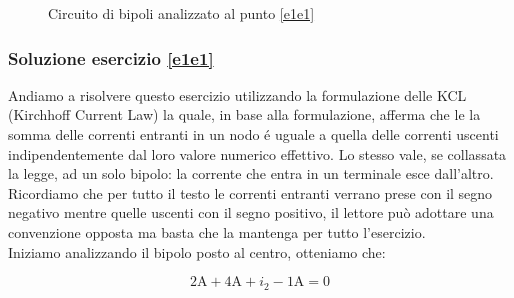 \documentclass[../main.tex]{subfiles}
\begin{document}
\begin{figure}[h!]
\begin{center}

	
\end{center}
\caption{Circuito di bipoli analizzato al punto \ref{e1e1}}
\end{figure}
\label{fe1e1}


\subsubsection*{Soluzione esercizio \ref{e1e1}}

Andiamo a risolvere questo esercizio utilizzando la formulazione delle KCL (Kirchhoff Current Law) la quale, in base alla formulazione, afferma che le la somma delle correnti entranti in un nodo é uguale a quella delle correnti uscenti indipendentemente dal loro valore numerico effettivo. Lo stesso vale, se collassata la legge, ad un solo bipolo: la corrente che entra in un terminale esce dall'altro.\\

Ricordiamo che per tutto il testo le correnti entranti verrano prese con il segno negativo mentre quelle uscenti con il segno positivo, il lettore può adottare una convenzione opposta ma basta che la mantenga per tutto l'esercizio.\\

Iniziamo analizzando il bipolo posto al centro, otteniamo che:

\begin{equation}
	\text{2A} + \text{4A} + i_2 - \text{1A} = 0
\end{equation}
\end{document}
